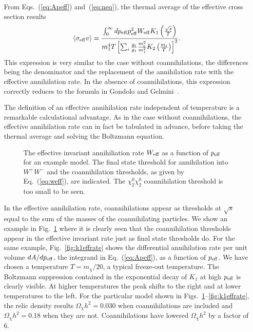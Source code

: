 {}From Eqs.~(\ref{eq:Apeff}) and~(\ref{eq:neq}), the thermal average of
the effective cross section results
\begin{equation} \label{eq:sigmavefffin2}
  \langle \sigma_{\rm{eff}}v \rangle = \frac{\int_0^\infty
  dp_{\rm{eff}} p_{\rm{eff}}^2 W_{\rm{eff}} K_1 \left(
  \frac{\sqrt{s}}{T} \right) } { m_1^4 T \left[ \sum_i \frac{g_i}{g_1}
  \frac{m_i^2}{m_1^2} K_2 \left(\frac{m_i}{T}\right) \right]^2}.
\end{equation}
This expression is very similar to the case without coannihilations,
the differences being the denominator and the replacement of the
annihilation rate with the effective annihilation rate. 
In the absence of coannihilations, this expression
correctly reduces to the formula in Gondolo and
Gelmini~\cite{GondoloGelmini}.

The definition of an effective annihilation rate independent of
temperature is a remarkable calculational advantage. As in the case
without coannihilations, the effective annihilation rate can in fact
be tabulated in advance, before taking the thermal average and
solving the Boltzmann equation.

\begin{figure}
  \centerline{}
  \caption{The effective invariant annihiliation rate $W_{\rm eff}$
    as a function of $p_{\rm eff}$ for an example model. 
    The final state threshold for
    annihilation into $W^+ W^-$ and the coannihilation thresholds, as
    given by Eq.~(\protect\ref{eq:weff}), are indicated.  
    The $\chi_2^0 \chi_2^0$ coannihilation threshold is too small to
    be seen.}
  \label{fig:effrate}
\end{figure}

In the effective annihilation rate, coannihilations appear
as thresholds at $\sqrt{s}$ equal to the sum of the masses of the
coannihilating particles.  We show an example in
Fig.~\ref{fig:effrate} where it is clearly seen that the
coannihilation thresholds appear in the effective invariant rate
just as final state thresholds do.  For the same example,
Fig.~\ref{fig:k1effrate} shows the differential annihilation rate
per unit volume $dA/dp_{\rm eff}$, the integrand in
Eq.~(\ref{eq:Apeff}), as a function of $p_{\rm eff}$. We have
chosen a temperature $T=m_{\chi}/20$, a typical freeze-out
temperature. The Boltzmann suppression contained in the exponential
decay of $K_{1}$ at high $p_{\rm eff}$ is clearly visible.  At
higher temperatures the peak shifts to the right and at lower
temperatures to the left.  For the particular model shown in
Figs.~\ref{fig:effrate}--\ref{fig:k1effrate}, the relic density
results $\Omega_\chi h^2=0.030$ when coannihilations are included
and $\Omega_\chi h^2=0.18$ when they are not. Coannihilations
have lowered $\Omega_\chi h^2$ by a factor of 6.

